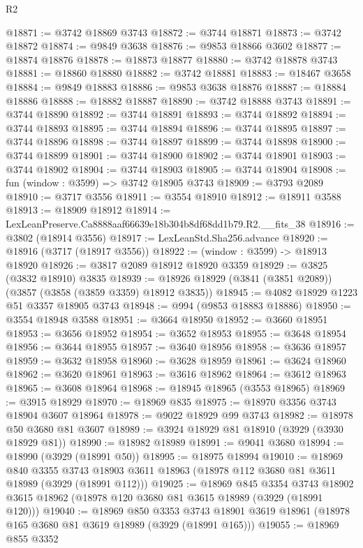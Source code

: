 \begin{lexlean}{R2}
\begin{coremodule}
@18871 := @3742 @18869 @3743
@18872 := @3744 @18871
@18873 := @3742 @18872
@18874 := @9849 @3638
@18876 := @9853 @18866 @3602
@18877 := @18874 @18876
@18878 := @18873 @18877
@18880 := @3742 @18878 @3743
@18881 := @18860 @18880
@18882 := @3742 @18881
@18883 := @18467 @3658
@18884 := @9849 @18883
@18886 := @9853 @3638 @18876
@18887 := @18884 @18886
@18888 := @18882 @18887
@18890 := @3742 @18888 @3743
@18891 := @3744 @18890
@18892 := @3744 @18891
@18893 := @3744 @18892
@18894 := @3744 @18893
@18895 := @3744 @18894
@18896 := @3744 @18895
@18897 := @3744 @18896
@18898 := @3744 @18897
@18899 := @3744 @18898
@18900 := @3744 @18899
@18901 := @3744 @18900
@18902 := @3744 @18901
@18903 := @3744 @18902
@18904 := @3744 @18903
@18905 := @3744 @18904
@18908 := fun (window : @3599) => @3742 @18905 @3743
@18909 := @3793 @2089
@18910 := @3717 @3556
@18911 := @3554 @18910
@18912 := @18911 @3588
@18913 := @18909 @18912
@18914 := LexLeanPreserve.Ca8888aaf66639e18b304b8df68dd1b79.R2.__fits_38
@18916 := @3802 (@18914 @3556)
@18917 := LexLeanStd.Sha256.advance
@18920 := @18916 (@3717 (@18917 @3556))
@18922 := (window : @3599) -> @18913 @18920
@18926 := @3817 @2089 @18912 @18920 @3359
@18929 := @3825 (@3832 @18910) @3835
@18939 := @18926 @18929 (@3841 (@3851 @2089)) (@3857 (@3858 (@3859 @3359) @18912 @3835))
@18945 := @4082 @18929 @1223 @51 @3357 @18905 @3743
@18948 := @994 (@9853 @18883 @18886)
@18950 := @3554 @18948 @3588
@18951 := @3664 @18950
@18952 := @3660 @18951
@18953 := @3656 @18952
@18954 := @3652 @18953
@18955 := @3648 @18954
@18956 := @3644 @18955
@18957 := @3640 @18956
@18958 := @3636 @18957
@18959 := @3632 @18958
@18960 := @3628 @18959
@18961 := @3624 @18960
@18962 := @3620 @18961
@18963 := @3616 @18962
@18964 := @3612 @18963
@18965 := @3608 @18964
@18968 := @18945 @18965 (@3553 @18965)
@18969 := @3915 @18929
@18970 := @18969 @835
@18975 := @18970 @3356 @3743 @18904 @3607 @18964
@18978 := @9022 @18929 @99 @3743
@18982 := @18978 @50 @3680 @81 @3607
@18989 := @3924 @18929 @81 @18910 (@3929 (@3930 @18929 @81))
@18990 := @18982 @18989
@18991 := @9041 @3680
@18994 := @18990 (@3929 (@18991 @50))
@18995 := @18975 @18994
@19010 := @18969
    @840
    @3355
    @3743
    @18903
    @3611
    @18963
    (@18978 @112 @3680 @81 @3611 @18989 (@3929 (@18991 @112)))
@19025 := @18969
    @845
    @3354
    @3743
    @18902
    @3615
    @18962
    (@18978 @120 @3680 @81 @3615 @18989 (@3929 (@18991 @120)))
@19040 := @18969
    @850
    @3353
    @3743
    @18901
    @3619
    @18961
    (@18978 @165 @3680 @81 @3619 @18989 (@3929 (@18991 @165)))
@19055 := @18969
    @855
    @3352

\end{coremodule}
\end{lexlean}
